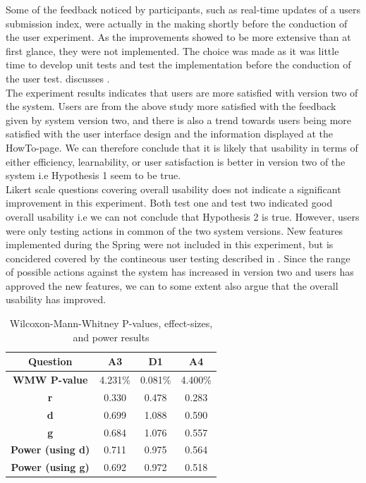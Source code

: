 Some of the feedback noticed by participants, such as real-time updates of a users submission index, were actually in the making shortly before the conduction of the user experiment. As the improvements showed to be more extensive than at first glance, they were not implemented. The choice was made as it was little time to develop unit tests and test the implementation before the conduction of the user test.  discusses . \\

The experiment results indicates that users are more satisfied with version two of the system. Users are from the above study more satisfied with the feedback given by system version two, and there is also a trend towards users being more satisfied with the user interface design and the information displayed at the HowTo-page. We can therefore conclude that it is likely that usability in terms of either efficiency, learnability, or user satisfaction is better in version two of the system i.e Hypothesis 1 seem to be true. \\

Likert scale questions covering overall usability does not indicate a significant improvement in this experiment. Both test one and test two indicated good overall usability i.e we can not conclude that Hypothesis 2 is true. However, users were only testing actions in common of the two system versions. New features implemented during the Spring were not included in this experiment, but is concidered covered by the contineous user testing described in . Since the range of possible actions against the system has increased in version two and users has approved the new features, we can to some extent also argue that the overall usability has improved.

\begin{table}[t!]
    \centering
    \begin{tabular}{|c||c||c||c||}
      \hline
      \textbf{Question} & \textbf{A3} & \textbf{D1} & \textbf{A4} \\\hline
      \textbf{WMW P-value} & 4.231\% & 0.081\% & 4.400\%  \\ \hline
      \textbf{r} & 0.330 & 0.478 & 0.283\\ \hline
      \textbf{d} & 0.699 & 1.088 & 0.590 \\ \hline
      \textbf{g} & 0.684 & 1.076 & 0.557\\ \hline
      \textbf{Power (using d)} & 0.711 & 0.975 & 0.564 \\ \hline
      \textbf{Power (using g)} & 0.692 & 0.972 & 0.518 \\ \hline
    \end{tabular}
    \caption{Wilcoxon-Mann-Whitney P-values, effect-sizes, and power results}
    \label{tab:significant-results}
\end{table}

